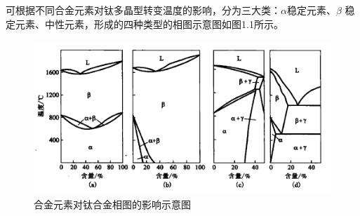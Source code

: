 可根据不同合金元素对钛多晶型转变温度的影响，分为三大类：$\alpha$稳定元素、$\beta$ 稳定元素、中性元素，形成的四种类型的相图示意图如图1.1所示。
\begin{figure}[h!]
	\centering
	\includegraphics[width=0.9\linewidth]{pic/01}
	\caption{合金元素对钛合金相图的影响示意图}
	\label{fig:01}
\end{figure}

